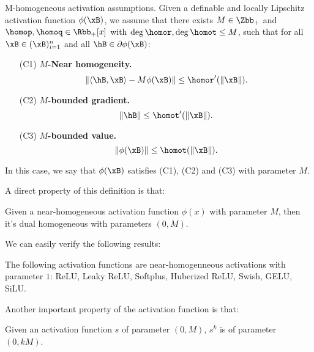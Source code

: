 \begin{definition}
\label{def:near-homo-activation}
{M-homogeneous activation assumptions.} Given a definable and locally Lipschitz activation function $\phi(\xB)$, we assume that there exists $M\in \Zbb_+$ and $\homop, \homoq \in \Rbb_+[x]$ with $\deg \homor, \deg \homot  \le  M$, such that for all $\xB\in (\xB)_{i=1}^n$ and all $ \hB \in \partial \phi(\xB) $: 
\begin{itemize}
    \item [(C1)] \textbf{$M$-Near homogeneity.} 
    \[
        \|\langle \hB, \xB \rangle - M \phi(\xB)\| \le \homor^\prime (\|\xB\|).
    \]
    \item [(C2)] \textbf{$M$-bounded gradient.}
    \[
        \| \hB\| \le \homot^\prime (\|\xB\|).
    \]
    \item [(C3)]  \textbf{$M$-bounded value.}
    \[
        \|\phi(\xB)\| \le \homot(\|\xB\|).  
    \]
\end{itemize}
In this case, we say that $\phi(\xB)$ satisfies (C1), (C2) and (C3) with parameter $M$.
\end{definition}

A direct property of this definition is that: 

\begin{corollary}
\label{cor:Near-homo activation as dual homo block}
Given a near-homogeneous activation function $\phi(x)$ with parameter $M$, then it's dual homogeneous with parameters $(0,M)$. 
\end{corollary}



We can easily verify  the following results: 

\begin{example}
\label{eg: Activation functions}
The following activation functions are near-homogenneous activations with parameter $1$: ReLU, Leaky ReLU, Softplus, Huberized ReLU, Swish, GELU, SiLU. 
\end{example}

Another important property of the activation function is that: 
\begin{lemma}
    \label{lem:power-activation}
    Given an activation function $s$ of parameter $(0,M)$, $s^k$ is of parameter $(0,kM)$. 
\end{lemma}

